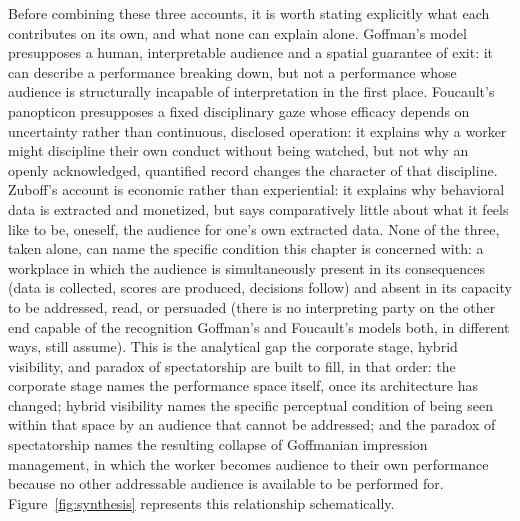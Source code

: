\documentclass[10pt]{article}
\begin{document}
Before combining these three accounts, it is worth stating explicitly what each contributes on its own, and what none can explain alone. Goffman's model presupposes a human, interpretable audience and a spatial guarantee of exit: it can describe a performance breaking down, but not a performance whose audience is structurally incapable of interpretation in the first place. Foucault's panopticon presupposes a fixed disciplinary gaze whose efficacy depends on uncertainty rather than continuous, disclosed operation: it explains why a worker might discipline their own conduct without being watched, but not why an openly acknowledged, quantified record changes the character of that discipline. Zuboff's account is economic rather than experiential: it explains why behavioral data is extracted and monetized, but says comparatively little about what it feels like to be, oneself, the audience for one's own extracted data. None of the three, taken alone, can name the specific condition this chapter is concerned with: a workplace in which the audience is simultaneously present in its consequences (data is collected, scores are produced, decisions follow) and absent in its capacity to be addressed, read, or persuaded (there is no interpreting party on the other end capable of the recognition Goffman's and Foucault's models both, in different ways, still assume). This is the analytical gap the corporate stage, hybrid visibility, and paradox of spectatorship are built to fill, in that order: the corporate stage names the performance space itself, once its architecture has changed; hybrid visibility names the specific perceptual condition of being seen within that space by an audience that cannot be addressed; and the paradox of spectatorship names the resulting collapse of Goffmanian impression management, in which the worker becomes audience to their own performance because no other addressable audience is available to be performed for. Figure~\ref{fig:synthesis} represents this relationship schematically.
\end{document}
